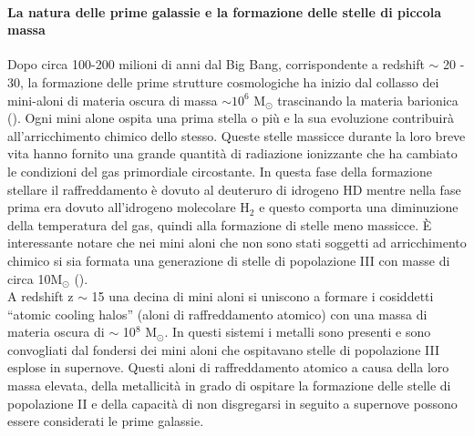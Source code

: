 \documentclass[12pt]{article}
\begin{document}
\paragraph{La natura delle prime galassie e la formazione delle stelle di piccola massa}
\label{natura_galassie}
Dopo circa 100-200 milioni di anni dal Big Bang, corrispondente a redshift $\sim$ 20 - 30, la formazione delle prime strutture cosmologiche ha inizio dal collasso dei mini-aloni di materia oscura di massa $\sim 10^{6}$ M$_{\odot}$ trascinando la materia barionica (\cite{Greif_2011}). Ogni mini alone ospita una prima stella o più e la sua evoluzione contribuirà all’arricchimento chimico dello stesso. Queste stelle massicce durante la loro breve vita hanno fornito una grande quantità di radiazione ionizzante che ha cambiato le condizioni del gas primordiale circostante. In questa fase della formazione stellare il raffreddamento è dovuto al deuteruro di idrogeno HD mentre nella fase prima era dovuto all’idrogeno molecolare H$_{2}$ e questo comporta una diminuzione della temperatura del gas, quindi alla formazione di stelle meno massicce. È interessante notare che nei mini aloni che non sono stati soggetti ad arricchimento chimico si sia formata una generazione di stelle di popolazione III con masse di circa 10M$_{\odot}$ (\cite{Johnson}). \\
A redshift z $\sim$ 15 una decina di mini aloni si uniscono a formare i cosiddetti “atomic cooling halos” (aloni di raffreddamento atomico) con una massa di materia oscura di $\sim$ 10$^{8}$ M$_{\odot}$.  In questi sistemi i metalli sono presenti e sono convogliati dal fondersi dei mini aloni che ospitavano stelle di popolazione III esplose in supernove. 
Questi aloni di raffreddamento atomico a causa della loro massa elevata, della metallicità in grado di ospitare la formazione delle stelle di popolazione II e della capacità di non disgregarsi in seguito a supernove possono essere considerati le prime galassie. \\
\end{document}
